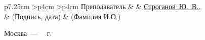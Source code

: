\begin{titlepage}
\begin{table}[h!]
		\begin{signstabular}[0.7]{p{7.25cm} >{\centering\arraybackslash}p{4cm} >{\centering\arraybackslash}p{4cm}}
			Преподаватель & \uline{\mbox{\hspace*{4cm}}} & \uline{\hfill Строганов~Ю.~В.. \hfill} \\
			& \scriptsize (Подпись, дата) & \scriptsize (Фамилия И.О.)
		\end{signstabular}
	\end{table}
	\begin{center}
		\vfill
		Москва~---~\the\year
		~г.
	\end{center}
	\restoregeometry
\end{titlepage}


